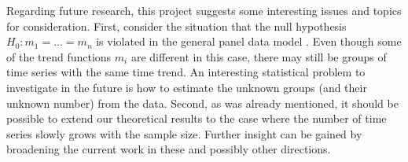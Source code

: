 \documentclass[a4paper,12pt]{article}
\makeatletter
\renewcommand{\eqref}[1]{\tagform@{\ref{#1}}}
\makeatother
\begin{document}
Regarding future research, this project suggests some interesting issues and topics for consideration. First, consider the situation that the null hypothesis $H_0: m_1 = \ldots = m_n$ is violated in the general panel data model \eqref{eq:model}. Even though some of the trend functions $m_i$ are different in this case, there may still be groups of time series with the same time trend. An interesting statistical problem to investigate in the future is how to estimate the unknown groups (and their unknown number) from the data. Second, as was already mentioned, it should be possible to extend our theoretical results to the case where the number of time series slowly grows with the sample size. Further insight can be gained by broadening the current work in these and possibly other directions.

\newpage

{\small
\setlength{\bibsep}{0.55em}
}


\end{document}
